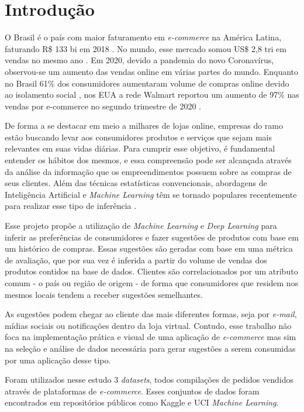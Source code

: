 \chapter{Introdução}
\pagestyle{simple} 

O Brasil é o país com maior faturamento em \textit{e-commerce} na América Latina, faturando R\$ 133 bi em 2018 \cite{ebit19}. No mundo, esse mercado somou US\$ 2,8 tri em vendas no mesmo ano \cite{shopify19}. Em 2020, devido a pandemia do novo Coronavírus, observou-se um aumento das vendas online em várias partes do mundo. Enquanto no Brasil 61\% dos consumidores aumentaram volume de compras online devido ao isolamento social \cite{sbvc20}, nos EUA a rede Walmart reportou um aumento de 97\% nas vendas por e-commerce no segundo trimestre de 2020 \cite{perez20}.

De forma a se destacar em meio a milhares de lojas online, empresas do ramo estão buscando levar aos consumidores produtos e serviços que sejam mais relevantes em suas vidas diárias. Para cumprir esse objetivo, é fundamental entender os hábitos dos mesmos, e essa compreensão pode ser alcançada através da análise da informação que os empreendimentos possuem sobre as compras de seus clientes. Além das técnicas estatísticas convencionais, abordagens de Inteligência Artificial e \textit{Machine Learning} têm se tornado populares recentemente para realizar esse tipo de inferência \cite{rheude19}.

Esse projeto propõe a utilização de \textit{Machine Learning} e \textit{Deep Learning} para inferir as preferências de consumidores e fazer sugestões de produtos com base em um histórico de compras. Essas sugestões são geradas com base em uma métrica de avaliação, que por sua vez é inferida a partir do volume de vendas dos produtos contidos na base de dados. Clientes são correlacionados por um atributo comum - o país ou região de origem - de forma que consumidores que residem nos mesmos locais tendem a receber sugestões semelhantes.

As sugestões podem chegar ao cliente das mais diferentes formas, seja por \textit{e-mail}, mídias sociais ou notificações dentro da loja virtual. Contudo, esse trabalho não foca na implementação prática e visual de uma aplicação de \textit{e-commerce} mas sim na seleção e análise de dados necessária para gerar sugestões a serem consumidas por uma aplicação desse tipo.

Foram utilizados nesse estudo 3 \textit{datasets}, todos compilações de pedidos vendidos através de plataformas de \textit{e-commerce}. Esses conjuntos de dados foram encontrados em repositórios públicos como Kaggle e UCI \textit{Machine Learning}.

